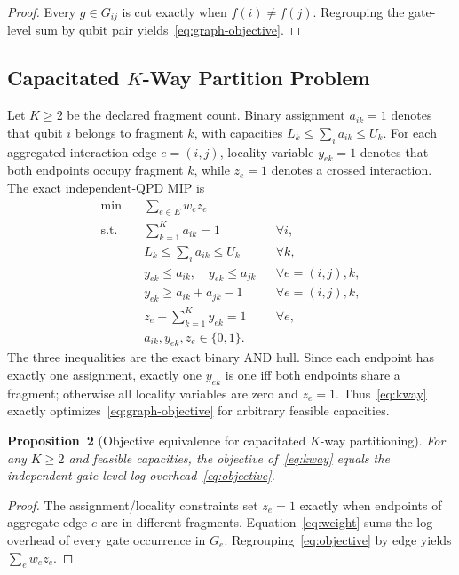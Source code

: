 \documentclass[11pt]{article}
\begin{document}
\begin{proof} Every $g\in G_{ij}$ is cut exactly when $f(i)\neq f(j)$. Regrouping the gate-level sum by qubit pair yields~\eqref{eq:graph-objective}.\end{proof}

\subsection{Capacitated $K$-Way Partition Problem}

Let $K\geq2$ be the declared fragment count. Binary assignment $a_{ik}=1$ denotes that qubit $i$ belongs to fragment $k$, with capacities $L_k\leq\sum_i a_{ik}\leq U_k$. For each aggregated interaction edge $e=(i,j)$, locality variable $y_{ek}=1$ denotes that both endpoints occupy fragment $k$, while $z_e=1$ denotes a crossed interaction. The exact independent-QPD MIP is
\begin{equation}
\begin{aligned}
\min\quad & \sum_{e\in E} w_e z_e\\
\text{s.t.}\quad & \sum_{k=1}^{K} a_{ik}=1 && \forall i,\\
& L_k\leq\sum_i a_{ik}\leq U_k && \forall k,\\
& y_{ek}\leq a_{ik},\quad y_{ek}\leq a_{jk} && \forall e=(i,j),k,\\
& y_{ek}\geq a_{ik}+a_{jk}-1 && \forall e=(i,j),k,\\
& z_e+\sum_{k=1}^{K}y_{ek}=1 && \forall e,\\
& a_{ik},y_{ek},z_e\in\{0,1\}.&
\end{aligned}
\label{eq:kway}
\end{equation}
The three inequalities are the exact binary AND hull. Since each endpoint has exactly one assignment, exactly one $y_{ek}$ is one iff both endpoints share a fragment; otherwise all locality variables are zero and $z_e=1$. Thus~\eqref{eq:kway} exactly optimizes~\eqref{eq:graph-objective} for arbitrary feasible capacities.

\textbf{Proposition~2} (Objective equivalence for capacitated $K$-way partitioning). \textit{For any $K\geq2$ and feasible capacities, the objective of~\eqref{eq:kway} equals the independent gate-level log overhead~\eqref{eq:objective}.}

\begin{proof} The assignment/locality constraints set $z_e=1$ exactly when endpoints of aggregate edge $e$ are in different fragments. Equation~\eqref{eq:weight} sums the log overhead of every gate occurrence in $G_e$. Regrouping~\eqref{eq:objective} by edge yields $\sum_e w_ez_e$.\end{proof}
\end{document}
